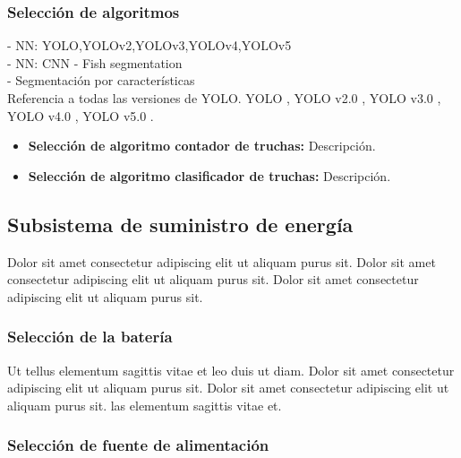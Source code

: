 \subsubsection{Selección de algoritmos}
\label{sssec:seleccion de algoritmos}

- NN: YOLO,YOLOv2,YOLOv3,YOLOv4,YOLOv5 \\
- NN: CNN - Fish segmentation \\
- Segmentación por características \\

Referencia a todas las versiones de YOLO. YOLO \cite{Redmon2016}, YOLO v2.0 \cite{Redmon2017}, YOLO v3.0 \cite{Redmon2018}, YOLO v4.0 \cite{Solawetz2020}, YOLO v5.0 \cite{bochkovskiy2020yolov4}.


\begin{itemize}
	
	\item \textbf{Selección de algoritmo contador de truchas:} Descripción.
	
	\item \textbf{Selección de algoritmo clasificador de truchas:} Descripción.
	
\end{itemize}

\subsection{Subsistema de suministro de energía}

 Dolor sit amet consectetur adipiscing elit ut aliquam purus sit. Dolor sit amet consectetur adipiscing elit ut aliquam purus sit. Dolor sit amet consectetur adipiscing elit ut aliquam purus sit.

\subsubsection{Selección de la batería} 

Ut tellus elementum sagittis vitae et leo duis ut diam. Dolor sit amet consectetur adipiscing elit ut aliquam purus sit.  Dolor sit amet consectetur adipiscing elit ut aliquam purus sit. las elementum sagittis vitae et.


\subsubsection{Selección de fuente de alimentación} 

